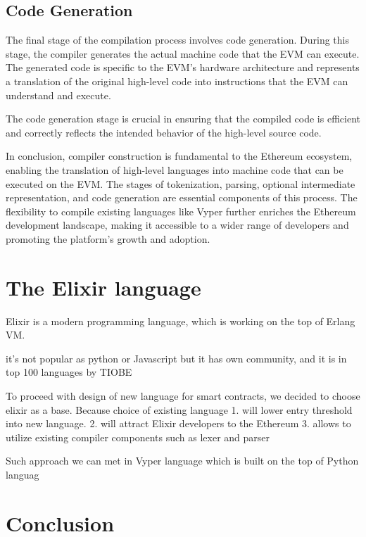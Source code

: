 \subsection{Code Generation}

  The final stage of the compilation process involves code generation. During this stage, the compiler generates the actual machine code that the EVM can execute. The generated code is specific to the EVM's hardware architecture and represents a translation of the original high-level code into instructions that the EVM can understand and execute.

  The code generation stage is crucial in ensuring that the compiled code is efficient and correctly reflects the intended behavior of the high-level source code.


In conclusion, compiler construction is fundamental to the Ethereum ecosystem, enabling the translation of high-level languages into machine code that can be executed on the EVM. The stages of tokenization, parsing, optional intermediate representation, and code generation are essential components of this process. The flexibility to compile existing languages like Vyper further enriches the Ethereum development landscape, making it accessible to a wider range of developers and promoting the platform's growth and adoption.

\section{The Elixir language}

Elixir is a modern programming language, which is working on the top of Erlang VM. 

it's not popular as python or Javascript but it has own community, and it is in top 100 languages by TIOBE \cite{TIOBE}

To proceed with design of new language for smart contracts, we decided to choose elixir as a base. Because choice of existing language
1. will lower entry threshold into new language.
2. will attract Elixir developers to the Ethereum
3. allows to utilize existing compiler components such as lexer and parser

Such approach we can met in Vyper language which is built on the top of Python languag
\section{Conclusion}



